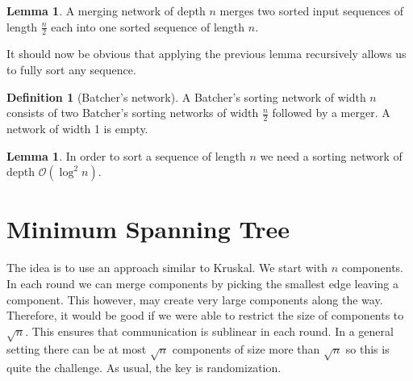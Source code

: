 \documentclass[a4paper, 12pt]{article}
\theoremstyle{plain}
\theoremstyle{definition}
\newtheorem{definition}[theorem]{Definition} %
\theoremstyle{lemma}
\newtheorem{lemma}[theorem]{Lemma}
\theoremstyle{remark}
\theoremstyle{corollary}
\theoremstyle{example}
\begin{document}
	\begin{lemma}
		A merging network of depth $n$ merges two sorted input sequences of length $\frac{n}{2}$ each into one sorted sequence of length $n$.
	\end{lemma}
	It should now be obvious that applying the previous lemma recursively allows us to fully sort any sequence.
	\begin{definition}[Batcher's network]
		A Batcher's sorting network of width $n$ consists of two Batcher's sorting networks of width $\frac{n}{2}$ followed by a merger. A network of width 1 is empty. 
	\end{definition}
	\begin{lemma}
		In order to sort a sequence of length $n$ we need a sorting network of depth $\mathcal{O}(\log^2 n)$.
	\end{lemma}
	\section{Minimum Spanning Tree}
	The idea is to use an approach similar to Kruskal. We start with $n$ components. In each round we can merge components by picking the smallest edge leaving a component. This however, may create very large components along the way. Therefore, it would be good if we were able to restrict the size of components to $\sqrt{n}$. This ensures that communication is sublinear in each round. In a general setting there can be at most $\sqrt{n}$ components of size more than $\sqrt{n}$ so this is quite the challenge. As usual, the key is randomization.\\
\end{document}
